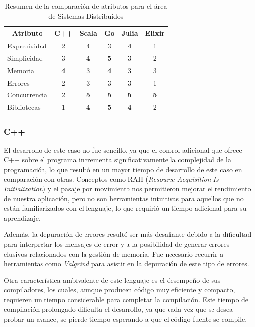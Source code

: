 \documentclass[11pt]{article}
\let\Oldsubsubsection\subsubsection
\renewcommand{\subsubsection}{\FloatBarrier\Oldsubsubsection}
\newcommand{\badMetric}[1]{{\color{BrickRed}#1}}
\newcommand{\goodMetric}[1]{{\textbf{#1}}}
\begin{document}
\begin{table}[h]
\centering
\begin{tabular}{|l|c|c|c|c|c|}
\hline
\multicolumn{1}{|c|}{Atributo} & C++ & Scala & Go & Julia & Elixir \\ \hline
Expresividad & \badMetric{2} & \goodMetric{4} & 3 & \goodMetric{4} & \badMetric{1} \\ \hline
Simplicidad & 3 & \goodMetric{4} & \goodMetric{5} & 3 & \badMetric{2} \\ \hline
Memoria & \goodMetric{4} & 3 & \goodMetric{4} & 3 & 3 \\ \hline
Errores & \badMetric{2} & 3 & 3 & 3 & \badMetric{1} \\ \hline
Concurrencia & \badMetric{2} & \goodMetric{5} & \goodMetric{5} & \goodMetric{5} & \goodMetric{5} \\ \hline
Bibliotecas & \badMetric{1} & \goodMetric{4} & \goodMetric{5} & \goodMetric{4} & \badMetric{2} \\ \hline
\end{tabular}
\caption{Resumen de la comparación de atributos para el área de Sistemas Distribuidos}
\label{tab:sis_dist:experiences}
\end{table}

\subsubsection{C++}

El desarrollo de este caso no fue sencillo, ya que el control adicional que ofrece C++ sobre el programa incrementa significativamente la complejidad de la programación, lo que resultó en un mayor tiempo de desarrollo de este caso en comparación con otras. Conceptos como RAII (\textit{Resource Acquisition Is Initialization}) \cite{cpp:doc:raii} y el pasaje por movimiento nos permitieron mejorar el rendimiento de nuestra aplicación, pero no son herramientas intuitivas para aquellos que no están familiarizados con el lenguaje, lo que requirió un tiempo adicional para su aprendizaje.

Además, la depuración de errores resultó ser más desafiante debido a la dificultad para interpretar los mensajes de error y a la posibilidad de generar errores elusivos relacionados con la gestión de memoria. Fue necesario recurrir a herramientas como \textit{Valgrind} \cite{cpp:lib:valgrind} para asistir en la depuración de este tipo de errores.

Otra característica ambivalente de este lenguaje es el desempeño de sus compiladores, los cuales, aunque producen código muy eficiente y compacto, requieren un tiempo considerable para completar la compilación. Este tiempo de compilación prolongado dificulta el desarrollo, ya que cada vez que se desea probar un avance, se pierde tiempo esperando a que el código fuente se compile.
\end{document}
